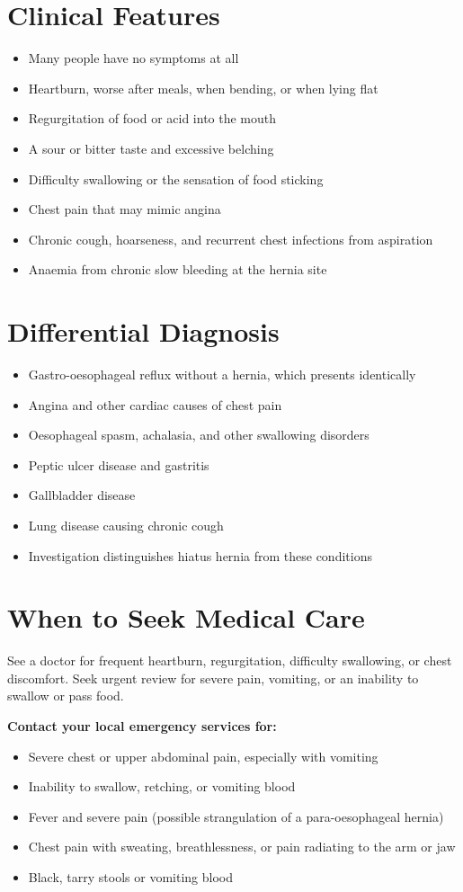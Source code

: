 \section*{Clinical Features}
\begin{itemize}
    \item Many people have no symptoms at all
    \item Heartburn, worse after meals, when bending, or when lying flat
    \item Regurgitation of food or acid into the mouth
    \item A sour or bitter taste and excessive belching
    \item Difficulty swallowing or the sensation of food sticking
    \item Chest pain that may mimic angina
    \item Chronic cough, hoarseness, and recurrent chest infections from aspiration
    \item Anaemia from chronic slow bleeding at the hernia site
\end{itemize}

\section*{Differential Diagnosis}
\begin{itemize}
    \item Gastro-oesophageal reflux without a hernia, which presents identically
    \item Angina and other cardiac causes of chest pain
    \item Oesophageal spasm, achalasia, and other swallowing disorders
    \item Peptic ulcer disease and gastritis
    \item Gallbladder disease
    \item Lung disease causing chronic cough
    \item Investigation distinguishes hiatus hernia from these conditions
\end{itemize}

\section*{When to Seek Medical Care}
See a doctor for frequent heartburn, regurgitation, difficulty swallowing, or chest discomfort. Seek urgent review for severe pain, vomiting, or an inability to swallow or pass food.

\textbf{Contact your local emergency services for:}
\begin{itemize}
    \item Severe chest or upper abdominal pain, especially with vomiting
    \item Inability to swallow, retching, or vomiting blood
    \item Fever and severe pain (possible strangulation of a para-oesophageal hernia)
    \item Chest pain with sweating, breathlessness, or pain radiating to the arm or jaw
    \item Black, tarry stools or vomiting blood
\end{itemize}

